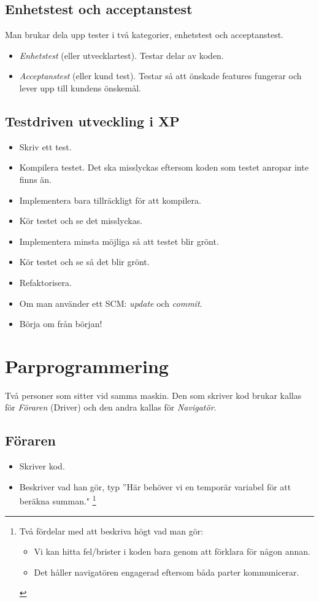 \documentclass[a4paper]{article}
\begin{document}
\subsection*{Enhetstest och acceptanstest}
Man brukar dela upp tester i två kategorier, enhetstest och acceptanstest.
\begin{itemize}
\item{\emph{Enhetstest} (eller utvecklartest). Testar delar av koden.}
\item{\emph{Acceptanstest} (eller kund test). Testar så att önskade features fungerar och lever upp till kundens önskemål.}
\end{itemize}


\subsection{Testdriven utveckling i XP}
\begin{itemize}
\item{Skriv ett test.}
\item{Kompilera testet. Det ska misslyckas eftersom koden som testet anropar inte finns än.}
\item{Implementera bara tillräckligt för att kompilera.}
\item{Kör testet och se det misslyckas.}
\item{Implementera minsta möjliga så att testet blir grönt.}
\item{Kör testet och se så det blir grönt.}
\item{Refaktorisera.}
\item{Om man använder ett SCM: \emph{update} och \emph{commit}.}
\item{Börja om från början!}

\end{itemize}

\section{Parprogrammering} %
Två personer som sitter vid samma maskin. Den som skriver kod brukar kallas för \emph{Föraren} (Driver) och den andra kallas för \emph{Navigatör}. 
\subsection*{Föraren}
\begin{itemize}
\item{Skriver kod.}
\item{Beskriver vad han gör, typ ''Här behöver vi en temporär variabel för att beräkna summan." \footnote{Två fördelar med att beskriva högt vad man gör: \begin{itemize}\item{Vi kan hitta fel/brister i koden bara genom att förklara för någon annan.} \item{Det håller navigatören engagerad eftersom båda parter kommunicerar.}\end{itemize}} }
\end{itemize}
\end{document}

